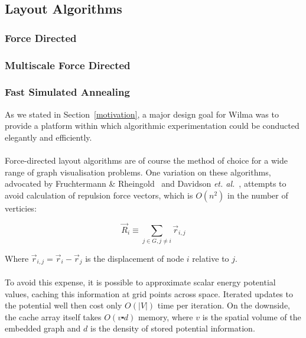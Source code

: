 \documentclass[runningheads]{cl2emult}
\begin{document}
\subsection{Layout Algorithms}
\subsubsection{Force Directed}
\subsubsection{Multiscale Force Directed}

\subsubsection{Fast Simulated Annealing}

As we stated in Section~\ref{motivation}, a major design goal for Wilma
was to provide a platform within which algorithmic experimentation could be
conducted elegantly and efficiently.

\paragraph{}

Force-directed layout algorithms are of course the method of choice for a
wide range of graph visualisation problems.  One variation on these
algorithms, advocated by Fruchtermann \&
Rheingold~\cite{fruchtermann90force-directed} and Davidson {\em et.
al.}~\cite{davidson01noise}, attempts to avoid calculation of repulsion force
vectors, which is $O(n^2)$ in the number of verticies:  

\begin{equation}
\vec{R}_i \equiv \sum_{j \in G, j \neq i} \vec{r}_{i,j}
\end{equation}

\noindent Where $\vec{r}_{i,j} = \vec{r}_i - \vec{r}_j$ is the displacement
of node $i$ relative to $j$.

\paragraph{}

To avoid this expense, it is possible to approximate scalar energy potential
values, caching this information at grid points across space.  Iterated
updates to the potential well then cost only $O(|V|)$ time per iteration.  On
the downside, the cache array itself takes $O(v \centerdot d)$ memory, where
$v$ is the spatial volume of the embedded graph and $d$ is the density of
stored potential information.
\end{document}
